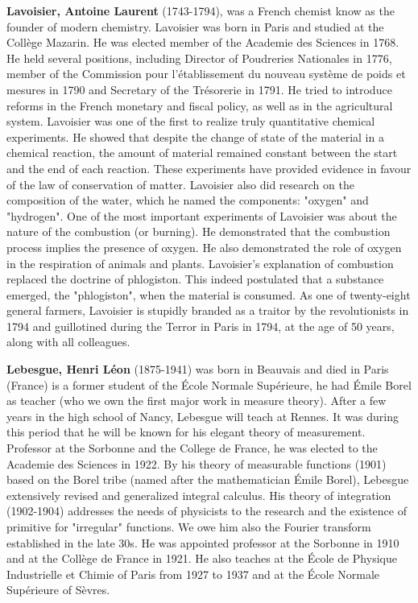 \textbf{Lavoisier, Antoine Laurent} (1743-1794), was a French chemist know as the founder of modern chemistry. Lavoisier was born in Paris and studied at the Collège Mazarin. He was elected member of the Academie des Sciences in 1768. He held several positions, including Director of Poudreries Nationales in 1776, member of the Commission pour l'établissement du nouveau système de poids et mesures in 1790 and Secretary of the Trésorerie in 1791. He tried to introduce reforms in the French monetary and fiscal policy, as well as in the agricultural system. Lavoisier was one of the first to realize truly quantitative chemical experiments. He showed that despite the change of state of the material in a chemical reaction, the amount of material remained constant between the start and the end of each reaction. These experiments have provided evidence in favour of the law of conservation of matter. Lavoisier also did research on the composition of the water, which he named the components: "oxygen" and "hydrogen". One of the most important experiments of Lavoisier was about the nature of the combustion (or burning). He demonstrated that the combustion process implies the presence of oxygen. He also demonstrated the role of oxygen in the respiration of animals and plants. Lavoisier's explanation of combustion replaced the doctrine of phlogiston. This indeed postulated that a substance emerged, the "phlogiston", when the material is consumed. As one of twenty-eight general farmers, Lavoisier is stupidly branded as a traitor by the revolutionists in 1794 and guillotined during the Terror in Paris in 1794, at the age of 50 years, along with all colleagues.

\textbf{Lebesgue, Henri Léon} (1875-1941) was born in Beauvais and died in Paris (France) is a former student of the École Normale Supérieure, he had Émile Borel as teacher (who we own the first major work in measure theory). After a few years in the high school of Nancy, Lebesgue will teach at Rennes. It was during this period that he will be known for his elegant theory of measurement. Professor at the Sorbonne and the College de France, he was elected to the Academie des Sciences in 1922. By his theory of measurable functions (1901) based on the Borel tribe (named after the mathematician Émile Borel), Lebesgue extensively revised and generalized integral calculus. His theory of integration (1902-1904) addresses the needs of physicists to the research and the existence of primitive for "irregular" functions. We owe him also the Fourier transform established in the late 30s. He was appointed professor at the Sorbonne in 1910 and at the Collège de France in 1921. He also teaches at the École de Physique Industrielle et Chimie of Paris from 1927 to 1937 and at the École Normale Supérieure of Sèvres.

